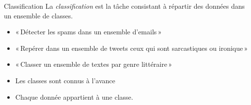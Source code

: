 \documentclass[hyperref={unicode}, xcolor={svgnames}, french]{beamer}
\begin{document}
\begin{frame}[fragile=singleslide]{Classification}
    La \emph{classification} est la tâche consistant à \alert{répartir} des données dans un ensemble de classes.
    \begin{itemize}
        \item « Détecter les spams dans un ensemble d'emails »
        \item « Repérer dans un ensemble de tweets ceux qui sont sarcastiques ou ironique »
        \item « Classer un ensemble de textes par genre littéraire »
    \end{itemize}
    \begin{figure}
        \tikzset{external/export=true}
    \end{figure}
    \begin{itemize}
        \item Les \textcolor{highlight8}{classes} sont connus à l'avance
        \item Chaque \textcolor{highlight4}{donnée} appartient à une classe.
    \end{itemize}
\end{frame}
\end{document}
